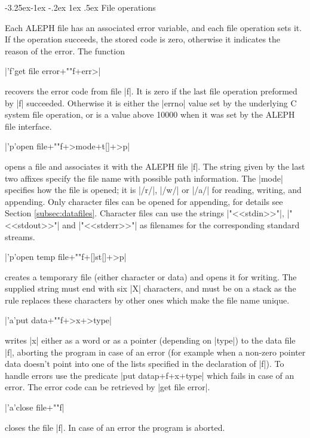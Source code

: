 \documentclass[titlepage]{article}
\makeatletter
\newcommand\A{\textsf{ALEPH}}
\newcommand\g[1]{\textsf{\color{blue!90!black}#1}}
\renewcommand\subsection{%
\@startsection{subsection}{2}{\z@}%
   {-3.25ex\@plus -1ex \@minus -.2ex}%
   {1ex \@plus .5ex}%
   {\normalfont\normalsize\bfseries}}
\makeatother
\begin{document}
\subsection{File operations}

Each \A{} file has an associated error variable, and each file operation sets
it. If the operation succeeds, the stored code is zero, otherwise it
indicates the reason of the error. The function

\pp|'f'get file error+""f+err>|

\noindent
recovers the error code from file \pp|f|. It is zero if the last file
operation preformed by \pp|f| succeeded. Otherwise it is either the
\pp|errno| value set by the underlying \textsf{C} system file operation, or
is a value above 10000 when it was set by the \A{} file interface.

\pp|'p'open file+""f+>mode+t[]+>p|

\noindent
opens a file and associates it with the \A{} file \pp|f|. The string given
by the last two affixes specify the file name with possible path
information. The \pp|mode| specifies how the file is opened; it is \pp|/r/|,
\pp|/w/| or \pp|/a/| for reading, writing, and appending. Only character
files can be opened for appending, for details see Section
\ref{subsec:datafiles}. Character files can use the strings
\pp|"<<stdin>>"|, \pp|"<<stdout>>"| and \pp|"<<stderr>>"| as filenames for
the corresponding standard streams.

\pp|'p'open temp file+""f+[]st[]+>p| 

\noindent
creates a temporary file (either character or data) and opens it for
writing. The supplied string must end with six \pp|X| characters, and must
be on a \g{stack} as the rule replaces these characters by other ones
which make the file name unique.

\pp|'a'put data+""f+>x+>type| 

\noindent
writes \pp|x| either as a word or as a pointer (depending on \pp|type|) to
the data file \pp|f|, aborting the program in case of an error (for example
when a non-zero pointer data doesn't point into one of the lists specified
in the declaration of \pp|f|). To handle errors use the predicate \pp|put
datap+f+x+type| which fails in case of an error. The error code can be
retrieved by \pp|get file error|.

\pp|'a'close file+""f|

\noindent
closes the file \pp|f|. In case of an error the program is aborted. 
\end{document}
